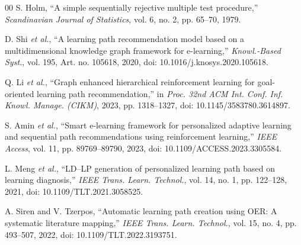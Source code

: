 \begin{thebibliography}{00}
 S. Holm, ``A simple sequentially rejective multiple test procedure,'' \emph{Scandinavian Journal of Statistics}, vol. 6, no. 2, pp. 65--70, 1979.



 D. Shi \emph{et al.}, ``A learning path recommendation model based on a multidimensional knowledge graph framework for e-learning,'' \emph{Knowl.-Based Syst.}, vol. 195, Art. no. 105618, 2020, doi: 10.1016/j.knosys.2020.105618.

 Q. Li \emph{et al.}, ``Graph enhanced hierarchical reinforcement learning for goal-oriented learning path recommendation,'' in \emph{Proc. 32nd ACM Int. Conf. Inf. Knowl. Manage. (CIKM)}, 2023, pp. 1318--1327, doi: 10.1145/3583780.3614897.

 S. Amin \emph{et al.}, ``Smart e-learning framework for personalized adaptive learning and sequential path recommendations using reinforcement learning,'' \emph{IEEE Access}, vol. 11, pp. 89769--89790, 2023, doi: 10.1109/ACCESS.2023.3305584.

 L. Meng \emph{et al.}, ``LD--LP generation of personalized learning path based on learning diagnosis,'' \emph{IEEE Trans. Learn. Technol.}, vol. 14, no. 1, pp. 122--128, 2021, doi: 10.1109/TLT.2021.3058525.

 A. Siren and V. Tzerpos, ``Automatic learning path creation using OER: A systematic literature mapping,'' \emph{IEEE Trans. Learn. Technol.}, vol. 15, no. 4, pp. 493--507, 2022, doi: 10.1109/TLT.2022.3193751.


\end{thebibliography}
